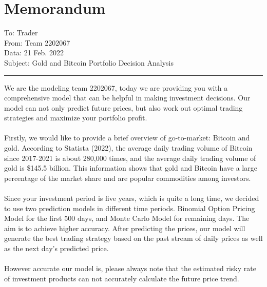 \documentclass[12pt]{article}
\begin{document}
\section{Memorandum}
To: Trader\\
From: Team 2202067\\
Data: 21 Feb. 2022\\
Subject: Gold and Bitcoin Portfolio Decision Analysis\\
\noindent\rule[0.25\baselineskip]{\textwidth}{1pt}
\newline
We are the modeling team 2202067, today we are providing you with a comprehensive model that can be helpful in making investment decisions. Our model can not only predict future prices, but also work out optimal trading strategies and maximize your portfolio profit.  
\paragraph{}
Firstly, we would like to provide a brief overview of go-to-market: Bitcoin and gold. According to Statista (2022), the average daily trading volume of Bitcoin since 2017-2021 is about 280,000 times, and the average daily trading volume of gold is \$145.5 billion. This information shows that gold and Bitcoin have a large percentage of the market share and are popular commodities among investors.
\paragraph{}
Since your investment period is five years, which is quite a long time, we decided to use two prediction models in different time periods. Binomial Option Pricing Model for the first 500 days, and Monte Carlo Model for remaining days. The aim is to achieve higher accuracy. After predicting the prices, our model will generate the best trading strategy based on the past stream of daily prices as well as the next day's predicted price. 
\paragraph{}
However accurate our model is, please always note that the estimated risky rate of investment products can not accurately calculate the future price trend. 
\end{document}
